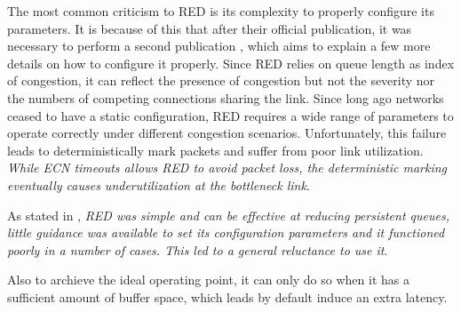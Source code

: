 The most common criticism to RED is its complexity to properly configure its
parameters. It is because of this that after their official publication, it
was necessary to perform a second publication \cite{NotesRED}, which aims to
explain a few more details on how to configure it properly. Since RED relies on
queue length as index of congestion, it can reflect the presence of congestion
but not the severity nor the numbers of competing connections sharing the
link. Since long ago networks ceased to have a static configuration, RED requires
a wide range of parameters to operate correctly under different congestion
scenarios. Unfortunately, this failure leads to deterministically mark packets
and suffer from poor link utilization. \emph{While  ECN timeouts allows RED
to avoid packet loss, the deterministic marking eventually causes
underutilization at the bottleneck link}\cite{FengBLUEAQM}.

As stated in \cite{NicholsJacobsonCQD}, \emph{RED was simple and can be
effective at reducing persistent queues, little guidance was available to set
its configuration parameters and it functioned poorly in a number of cases.
This led to a general reluctance to use it}.

Also to archieve the ideal operating point, it can only do so when it has a
sufficient amount of buffer space, which leads by default induce an extra
latency.
